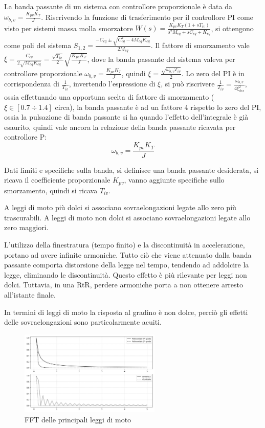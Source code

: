 La banda passante di un sistema con controllore proporzionale è data da \(\omega_{b,v}=\frac{K_{pv}K_T}{J}\).
Riscrivendo la funzione di trasferimento per il controllore PI come visto per sistemi massa molla smorzatore \(W(s)=\frac{K_{pv}K_T(1+sT_{iv})}{s^2M_{eq} + s C_{eq} + K_{eq}}\), si ottengono come poli del sistema \(S_{1,2}=\frac{-C_{eq}\pm\sqrt{C_{eq}^2-4M_{eq}K_{eq}}}{2M_{eq}}\). Il fattore di smorzamento vale \(\xi = \frac{C_{eq}}{2\sqrt{M_{eq}K_{eq}}}=\frac{\sqrt{T_{iv}}}{2}\sqrt{\frac{K_{pv}K_T}{J}}\), dove la banda passante del sistema valeva per controllore proporzionale \(\omega_{b,v}=\frac{K_{pv}K_T}{J}\), quindi \(\xi=\frac{\sqrt{\omega_{b,v}T_{iv}}}{2}\).
Lo zero del PI è in corrispondenza di \(\frac{1}{T_{iv}}\), invertendo l'espressione di \(\xi\), si può riscrivere \(\frac{1}{T_{iv}} = \frac{\omega_{b,v}}{4\xi^2_{des}}\), ossia effettuando una opportuna scelta di fattore di smorzamento (\(\xi \in [0.7\div 1.4]\)  circa), la banda passante è ad un fattore 4 rispetto lo zero del PI, ossia la pulsazione di banda passante si ha quando l'effetto dell'integrale è già esaurito, quindi vale ancora la relazione della banda passante ricavata per controllore P:
\[\omega_{b,v}=\frac{K_{pv}K_T}{J}\]

Dati limiti e specifiche sulla banda, si definisce una banda passante desiderata, si ricava il coefficiente proporzionale \(K_{pv}\), vanno aggiunte specifiche sullo smorzamento, quindi si ricava \(T_{iv}\).

A leggi di moto più dolci si associano sovraelongazioni legate allo zero più trascurabili. A leggi di moto non dolci si associano sovraelongazioni legate allo zero maggiori.

L'utilizzo della finestratura (tempo finito) e la discontinuità in accelerazione, portano ad avere infinite armoniche. 
Tutto ciò che viene attenuato dalla banda passante comporta distorsione della legge nel tempo, tendendo ad addolcire la legge, eliminando le discontinuità. Questo effetto è più rilevante per leggi non dolci. Tuttavia, in una RtR, perdere armoniche porta a non ottenere arresto all'istante finale.

In termini di leggi di moto la risposta al gradino è non dolce, perciò gli effetti delle sovraelongazioni sono particolarmente acuiti.

\begin{figure}[h]
    \centering
    \includegraphics[width=0.6\textwidth]{Immagini/fft_leggi_di_moto.png}
    \caption{FFT delle principali leggi di moto}
\end{figure}

